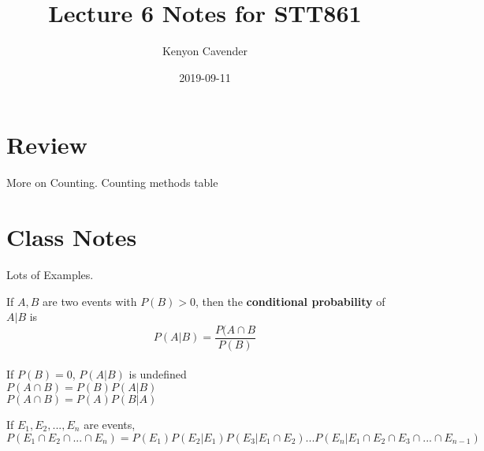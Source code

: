 \documentclass[14pt, oneside, letterpaper]{notes}
\begin{document}
\title{Lecture 6 Notes for STT861}
\author{Kenyon Cavender}
\date{2019-09-11}
\maketitle

\section{Review}
More on Counting.  Counting methods table



\section{Class Notes}
Lots of Examples.

\begin{mydef}
	If $A,B$ are two events with $P(B) > 0$, then the 
	\textbf{conditional probability} of $A|B$ is \[P(A|B) = 
	\frac{P(A \cap B}{P(B)}\] \\
	If $P(B) = 0$, $P(A|B)$ is undefined \\
	$P(A \cap B) = P(B)P(A|B)$ \\
	$P(A \cap B) = P(A)P(B|A)$
\end{mydef}
\begin{mydef}
	If $E_1, E_2, ..., E_n$ are events, \\
	$P(E_1 \cap E_2 \cap ... \cap E_n) = P(E_1)P(E_2 | E_1)P(E_3|E_1 \cap E_2)
	... P(E_n|E_1 \cap E_2 \cap E_3 \cap ... \cap E_{n-1})$
\end{mydef}
\end{document}
